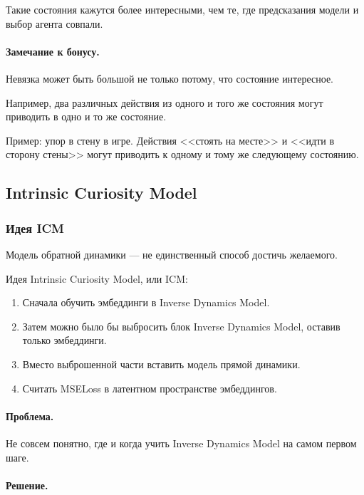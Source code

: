 \documentclass[12pt,a4paper]{article}
\begin{document}
Такие состояния кажутся более интересными, чем те, где предсказания модели и выбор агента совпали.

\paragraph{Замечание к бонусу.}

Невязка может быть большой не только потому, что состояние интересное.

Например, два различных действия из одного и того же состояния могут приводить в одно и то же состояние.

Пример: упор в стену в игре. Действия <<стоять на месте>> и <<идти в сторону стены>> могут приводить к одному и тому же следующему состоянию.

\subsection{Intrinsic Curiosity Model}

\subsubsection{Идея ICM}

Модель обратной динамики --- не единственный способ достичь желаемого.

Идея Intrinsic Curiosity Model, или ICM:

\begin{enumerate}
    \item Сначала обучить эмбеддинги в Inverse Dynamics Model.
    \item Затем можно было бы выбросить блок Inverse Dynamics Model, оставив только эмбеддинги.
    \item Вместо выброшенной части вставить модель прямой динамики.
    \item Считать MSELoss в латентном пространстве эмбеддингов.
\end{enumerate}

\paragraph{Проблема.}

Не совсем понятно, где и когда учить Inverse Dynamics Model на самом первом шаге.

\paragraph{Решение.}
\end{document}
